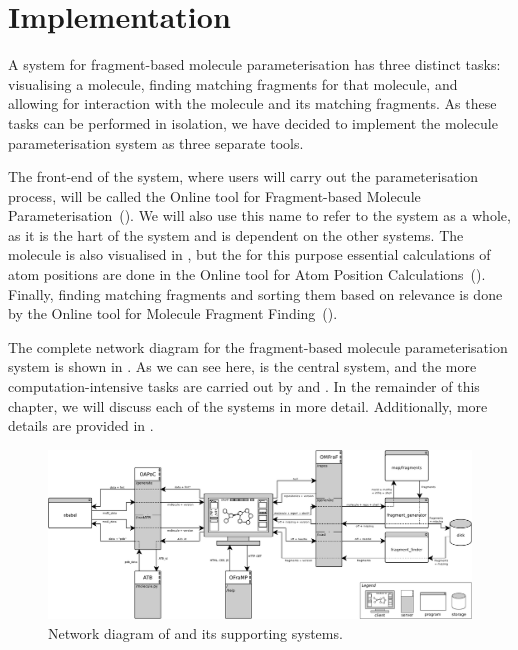 \chapter{Implementation}

\setcounter{topnumber}{1}
\setcounter{bottomnumber}{1}
\setlength{\textfloatsep}{1em}
\renewcommand{\topfraction}{0.9}
\renewcommand{\bottomfraction}{0.9}
\renewcommand{\textfraction}{0.1}

A system for fragment-based molecule parameterisation has three distinct tasks: visualising a molecule, finding matching fragments for that molecule, and allowing for interaction with the molecule and its matching fragments. As these tasks can be performed in isolation, we have decided to implement the molecule parameterisation system as three separate tools.

The front-end of the system, where users will carry out the parameterisation process, will be called the Online tool for Fragment-based Molecule Parameterisation~(\oframp). We will also use this name to refer to the system as a whole, as it is the hart of the system and is dependent on the other systems. The molecule is also visualised in \oframp, but the for this purpose essential calculations of atom positions are done in the Online tool for Atom Position Calculations~(\oapoc). Finally, finding matching fragments and sorting them based on relevance is done by the Online tool for Molecule Fragment Finding~(\omfraf).

The complete network diagram for the fragment-based molecule parameterisation system is shown in . As we can see here, \oframp{} is the central system, and the more computation-intensive tasks are carried out by \oapoc{} and \omfraf{}. In the remainder of this chapter, we will discuss each of the systems in more detail. Additionally, more details are provided in .

\begin{figure}
\center
\includegraphics[width=\textwidth]{img/network_diagram.pdf}
\vspace{1em}
\caption{Network diagram of \oframp{} and its supporting systems.}
\end{figure}



